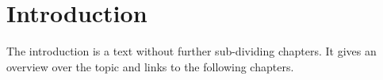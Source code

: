 \setchapterpreamble[u]{\margintoc}
\chapter{Introduction}

The introduction is a text without further sub-dividing chapters. It gives an overview over the topic and links to the following chapters. 